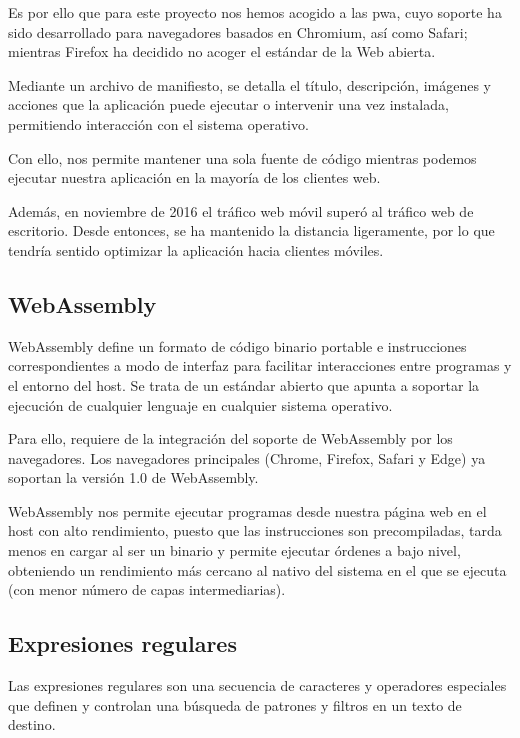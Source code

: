 Es por ello que para este proyecto nos hemos acogido a las \acrshort{pwa}, cuyo soporte ha sido desarrollado para navegadores basados en Chromium, así como Safari; mientras Firefox ha decidido no acoger el estándar de la Web abierta. \cite{firefoxNoPWA}

Mediante un archivo de manifiesto, se detalla el título, descripción, imágenes y acciones que la aplicación puede ejecutar o intervenir una vez instalada, permitiendo interacción con el sistema operativo.

Con ello, nos permite mantener una sola fuente de código mientras podemos ejecutar nuestra aplicación en la mayoría de los clientes web.

Además, en noviembre de 2016 el tráfico web móvil superó al tráfico web de escritorio. Desde entonces, se ha mantenido la distancia ligeramente, por lo que tendría sentido optimizar la aplicación hacia clientes móviles. \cite{movilTraficoMayor}

\subsection{WebAssembly}
\label{tec_hab:wam}


WebAssembly define un formato de código binario portable e instrucciones correspondientes a modo de interfaz para facilitar interacciones entre programas y el entorno del host. Se trata de un estándar abierto que apunta a soportar la ejecución de cualquier lenguaje en cualquier sistema operativo.

Para ello, requiere de la integración del soporte de WebAssembly por los navegadores. Los navegadores principales (Chrome, Firefox, Safari y Edge) ya soportan la versión 1.0 de WebAssembly.

WebAssembly nos permite ejecutar programas desde nuestra página web en el host con alto rendimiento, puesto que las instrucciones son precompiladas, tarda menos en cargar al ser un binario y permite ejecutar órdenes a bajo nivel, obteniendo un rendimiento más cercano al nativo del sistema en el que se ejecuta (con menor número de capas intermediarias).

\subsection{Expresiones regulares}
\label{tec_hab:regex}

Las expresiones regulares son una secuencia de caracteres y operadores especiales que definen y controlan una búsqueda de patrones y filtros en un texto de destino.

